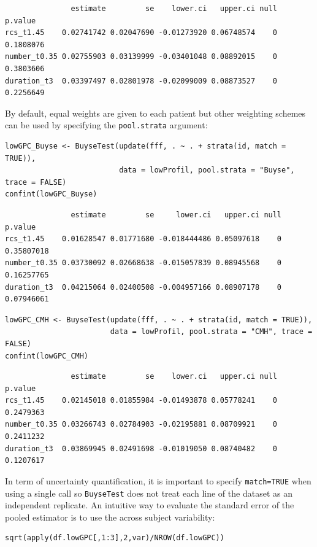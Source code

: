 \documentclass[12pt]{article}
\begin{document}
\begin{verbatim}
               estimate         se    lower.ci   upper.ci null   p.value
rcs_t1.45    0.02741742 0.02047690 -0.01273920 0.06748574    0 0.1808076
number_t0.35 0.02755903 0.03139999 -0.03401048 0.08892015    0 0.3803606
duration_t3  0.03397497 0.02801978 -0.02099009 0.08873527    0 0.2256649
\end{verbatim}


By default, equal weights are given to each patient but other
weighting schemes can be used by specifying the \texttt{pool.strata} argument:
\lstset{language=r,label= ,caption= ,captionpos=b,numbers=none}
\begin{lstlisting}
lowGPC_Buyse <- BuyseTest(update(fff, . ~ . + strata(id, match = TRUE)),
                          data = lowProfil, pool.strata = "Buyse", trace = FALSE)
confint(lowGPC_Buyse)
\end{lstlisting}

\begin{verbatim}
               estimate         se     lower.ci   upper.ci null    p.value
rcs_t1.45    0.01628547 0.01771680 -0.018444486 0.05097618    0 0.35807018
number_t0.35 0.03730092 0.02668638 -0.015057839 0.08945568    0 0.16257765
duration_t3  0.04215064 0.02400508 -0.004957166 0.08907178    0 0.07946061
\end{verbatim}


\lstset{language=r,label= ,caption= ,captionpos=b,numbers=none}
\begin{lstlisting}
lowGPC_CMH <- BuyseTest(update(fff, . ~ . + strata(id, match = TRUE)),
                        data = lowProfil, pool.strata = "CMH", trace = FALSE)
confint(lowGPC_CMH)
\end{lstlisting}

\begin{verbatim}
               estimate         se    lower.ci   upper.ci null   p.value
rcs_t1.45    0.02145018 0.01855984 -0.01493878 0.05778241    0 0.2479363
number_t0.35 0.03266743 0.02784903 -0.02195881 0.08709921    0 0.2411232
duration_t3  0.03869945 0.02491698 -0.01019050 0.08740482    0 0.1207617
\end{verbatim}


\clearpage

In term of uncertainty quantification, it is important to specify
\texttt{match=TRUE} when using a single call so \texttt{BuyseTest} does not treat
each line of the dataset as an independent replicate. An intuitive way
to evaluate the standard error of the pooled estimator is to use the
across subject variability:
\lstset{language=r,label= ,caption= ,captionpos=b,numbers=none}
\begin{lstlisting}
sqrt(apply(df.lowGPC[,1:3],2,var)/NROW(df.lowGPC))
\end{lstlisting}
\end{document}
